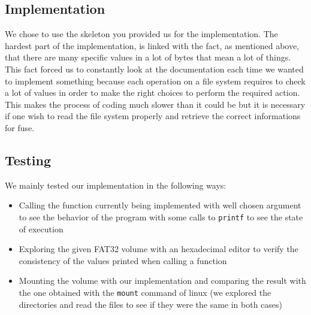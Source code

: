 \documentclass{article}
\begin{document}
\subsection{Implementation}

We chose to use the skeleton you provided us for the implementation. The hardest part of the implementation, is linked with the fact, as mentioned above, that there are many specific values in a lot of bytes that mean a lot of things. This fact forced us to constantly look at the documentation each time we wanted to implement something because each operation on a file system requires to check a lot of values in order to make the right choices to perform the required action.  This makes the process of coding much slower than it could be but it is necessary if one wish to read the file system properly and retrieve the correct informations for fuse.

\subsection{Testing}
We mainly tested our implementation in  the following ways:
\begin{itemize}
\item Calling the function currently being implemented with well chosen argument to see the behavior of the program with some calls to \texttt{printf} to see the state of execution
\item Exploring the given FAT32 volume with an hexadecimal editor to verify the consistency of the values printed when calling a function
\item Mounting the volume with our implementation and comparing the result with the one obtained with the \texttt{mount} command of linux (we explored the directories and read the files to see if they were the same in both cases)
\end{itemize}
\end{document}
